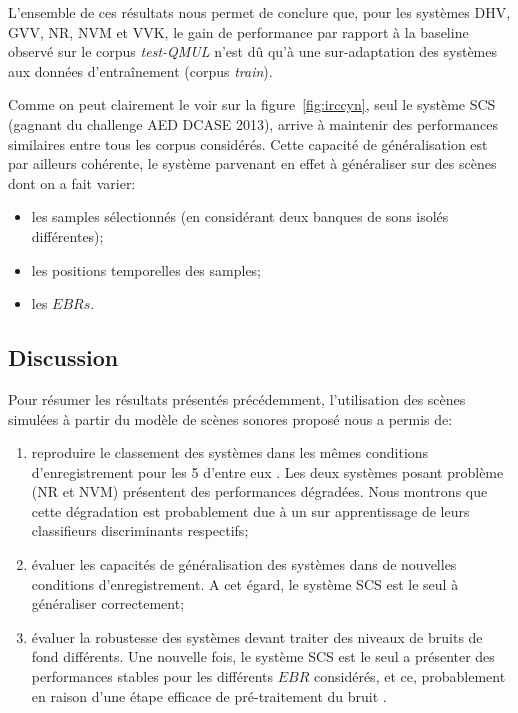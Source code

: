 L'ensemble de ces résultats nous permet de conclure que, pour les systèmes DHV, GVV, NR, NVM et VVK, le gain de performance par rapport à la baseline observé sur le corpus \emph{test-QMUL} n'est dû qu'à une sur-adaptation des systèmes aux données d'entraînement (corpus \emph{train}). 

Comme on peut clairement le voir sur la figure~\ref{fig:irccyn}, seul le système SCS (gagnant du challenge AED DCASE 2013), arrive à maintenir des performances similaires entre tous les corpus considérés. Cette capacité de généralisation est par ailleurs cohérente, le système parvenant en effet à généraliser sur des scènes dont on a fait varier: 

\begin{itemize}
\item les samples sélectionnés (en considérant deux banques de sons isolés différentes);
\item les positions temporelles des samples;
\item les $EBRs$.
\end{itemize}



\subsection{Discussion}

Pour résumer les résultats présentés précédemment, l'utilisation des scènes simulées à partir du modèle de scènes sonores proposé nous a permis de:

\begin{enumerate}
\item reproduire le classement des systèmes dans les mêmes conditions d'enregistrement pour les 5 d'entre eux . Les deux systèmes posant problème (NR et NVM) présentent des performances dégradées. Nous montrons que cette dégradation est probablement due à un sur apprentissage de leurs  classifieurs discriminants respectifs;
\item évaluer les capacités de généralisation des systèmes dans de nouvelles conditions d'enregistrement. A cet égard, le système SCS est le seul à généraliser correctement;
\item évaluer la robustesse des systèmes  devant traiter des niveaux de bruits de fond différents. Une nouvelle fois, le système SCS est le seul a présenter des performances stables pour les différents $EBR$ considérés, et ce, probablement en raison d'une étape efficace de pré-traitement du bruit .
\end{enumerate}

